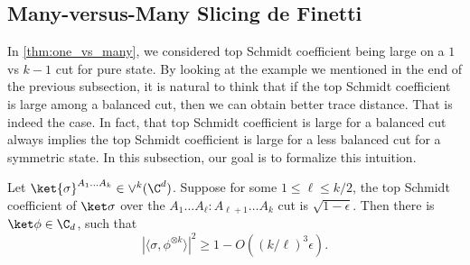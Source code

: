 \subsection{Many-versus-Many Slicing de Finetti}
In \cref{thm:one_vs_many}, we considered top Schmidt coefficient being large on a $1$ vs $k-1$ cut for pure state. By looking at the example we mentioned in the end of the previous subsection, it is natural to think that if the top Schmidt coefficient is large among a balanced cut, then we can obtain better trace distance. That is indeed the case. In fact, that top Schmidt coefficient is large for a balanced cut always implies the top Schmidt coefficient is large for a less balanced cut for a symmetric state. In this subsection, our goal is to formalize this intuition. 

\begin{theorem}\label{thm:many-many}
Let $\ket{\sigma}^{A_1\ldots A_k} \in \vee^k(\C^d)$. Suppose for some  $1\le\ell \le k/2$, the top Schmidt coefficient of $\ket\sigma$ over the $A_1\ldots A_\ell : A_{\ell+1}\ldots A_k$ cut is $\sqrt{1-\epsilon}$. Then there is  $\ket\phi\in\C_d$, such that
\[
    |\langle \sigma, \phi^{\otimes k}\rangle|^2 \ge 1 - O( (k/\ell)^3 \epsilon).
\]
\end{theorem}

